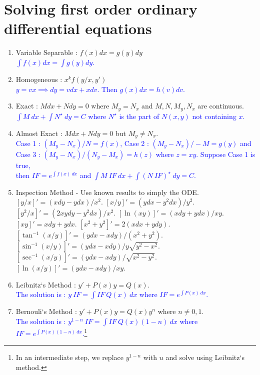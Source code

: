 \section{Solving first order ordinary differential equations}
\begin{enumerate}
	\item Variable Separable : $f(x)dx = g(y)dy$\\ 
	\textcolor{blue}{$\int f(x) dx = \int g(y) dy$.}
	\item Homogeneous : $x^k f(y/x,y')$ \\ 
	\textcolor{blue}{$y= vx \implies dy = vdx + xdv$. Then $g(x)dx = h(v)dv$.}
	\item Exact : $Mdx + Ndy = 0$ where $M_y = N_x$ and $M,N,M_y,N_x$ are continuous.\\
	\textcolor{blue}{$\int M\ dx + \int N^\star\ dy = C$ where $N^\star$ is the part of $N(x,y)$ not containing $x$.}
	\item Almost Exact : $Mdx + Ndy = 0$ but $M_y \ne N_x$. \\
		\textcolor{blue}{Case 1 : $(M_y - N_x)/N = f(x)$, Case 2 : $(M_y-N_x)/-M = g(y)$ and\\ Case 3 : $(M_y - N_x)/(N_y - M_x) = h(z)$ where $z = xy$.
		Suppose Case 1 is true,\\ then $I\!F = e^{\int f(x)\ dx}$ and $\int M\ I\!F\ dx + \int (N\ I\!F)^\star\ dy = C$.}
	\item Inspection Method - Use known results to simply the ODE.
		{\color{blue}
		\subitem $[y/x]' = (xdy - ydx)/x^2$.
		\subitem $[x/y]' = (ydx - y^2dx)/y^2$.
		\subitem $[y^2/x]' = (2xydy - y^2dx)/x^2$.
		\subitem $[\ln(xy)]' = (xdy+ydx)/xy$.
		\subitem $[xy]' = xdy + ydx$.
		\subitem $[x^2+y^2]' = 2(xdx + ydy)$.
		\subitem $[\tan^{-1} (x/y)]' = (ydx-xdy)/(x^2+y^2)$.
		\subitem $[\sin^{-1} (x/y)]' = (ydx-xdy)/y\sqrt{y^2-x^2}$.
		\subitem $[\sec^{-1} (x/y)]' = (ydx-xdy)/\sqrt{x^2-y^2}$.
		\subitem $[\ln(x/y)]' = (ydx-xdy)/xy$.
		}
	\item Leibnitz`s Method : $y'+P(x)y = Q(x)$.\\ 
	\textcolor{blue}{The solution is : $y\ I\!F = \int I\!F\ Q(x)\ dx$ where $I\!F = e^{\int P(x)\ dx}$.}
	\item Bernouli`s Method : $y'+P(x)y = Q(x)y^n$ where $n \ne 0,1$.\\ 
	\textcolor{blue}{The solution is : $y^{1-n}\ I\!F = \int I\!F\ Q(x)(1-n)\ dx$ where $I\!F = e^{\int P(x)(1-n)\ dx}$.\footnote{In an intermediate step, we replace $y^{1-n}$ with $u$ and solve using Leibnitz`s method.}}
\end{enumerate}
